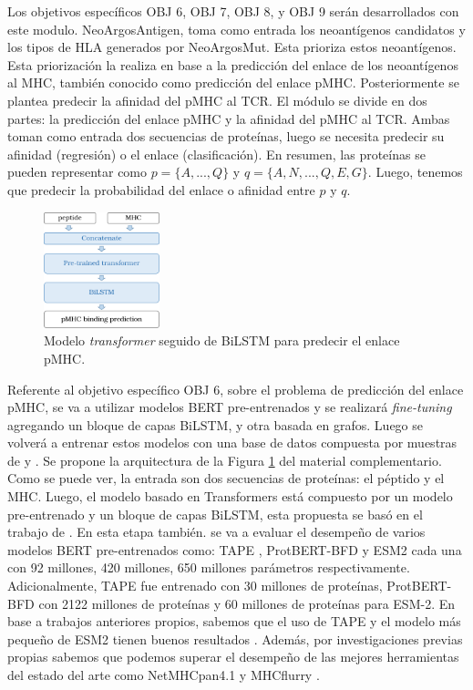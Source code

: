 \documentclass[a4paper,11pt]{article}
\begin{document}
Los objetivos específicos OBJ 6, OBJ  7, OBJ 8, y OBJ 9 serán desarrollados con este modulo. NeoArgosAntigen, toma como entrada los neoantígenos candidatos y los tipos de HLA generados por NeoArgosMut. Esta prioriza estos neoantígenos. Esta priorización la realiza en base a la predicción del enlace de los neoantígenos al MHC, también conocido como predicción del enlace pMHC. Posteriormente se plantea predecir la afinidad del pMHC al TCR. El módulo se divide en dos partes: la predicción del enlace pMHC y la afinidad del pMHC al TCR. Ambas toman como entrada dos secuencias de proteínas, luego se necesita predecir su afinidad (regresión) o el enlace (clasificación). En resumen, las proteínas se pueden representar como $p = \{ A, ... , Q \}$ y $q = \{ A, N, ... ,Q, E, G \}$. Luego, tenemos que  predecir la probabilidad del enlace o afinidad entre $p$ y $q$. 


\begin{figure}[H]
	\centering
	\includegraphics[width=0.30\textwidth]{../img/pipeline/proposal_pmhc}
	\caption{Modelo  \textit{transformer} seguido de BiLSTM para predecir el enlace pMHC.}
	\label{fig:proposal}
\end{figure}



Referente al objetivo específico OBJ 6, sobre el problema de predicción del enlace pMHC, se va a utilizar modelos BERT pre-entrenados y se realizará \textit{fine-tuning} agregando un bloque de capas BiLSTM, y otra basada en grafos. Luego se volverá a entrenar estos modelos con una base de datos compuesta por muestras de \cite{zhang2022hlab} y \cite{gfeller2023improved}. Se propone la arquitectura de la Figura \ref{fig:proposal} del material complementario. Como se puede ver, la entrada son dos secuencias de proteínas: el péptido y el MHC. Luego, el modelo basado en Transformers está compuesto por un modelo pre-entrenado y un bloque de capas BiLSTM, esta propuesta se basó en el trabajo de \cite{zhang2022hlab}. En esta etapa también. se va a evaluar el desempeño de varios modelos BERT pre-entrenados como: TAPE \cite{rao2019evaluating}, ProtBERT-BFD \cite{elnaggar2021prottrans} y ESM2 \cite{lin2023evolutionary} cada una con 92 millones, 420 millones, 650 millones parámetros respectivamente. Adicionalmente, TAPE fue entrenado con 30 millones de proteínas, ProtBERT-BFD con 2122 millones de proteínas y 60 millones de proteínas para ESM-2. En base a trabajos anteriores propios, sabemos que el uso de TAPE y el modelo más pequeño de ESM2 tienen buenos resultados \cite{arceda2023neoantigen}. Además, por investigaciones previas propias sabemos que podemos superar el desempeño de las mejores herramientas del estado del arte como NetMHCpan4.1 \cite{reynisson2020netmhcpan} y MHCflurry \cite{o2020mhcflurry}.
\end{document}
